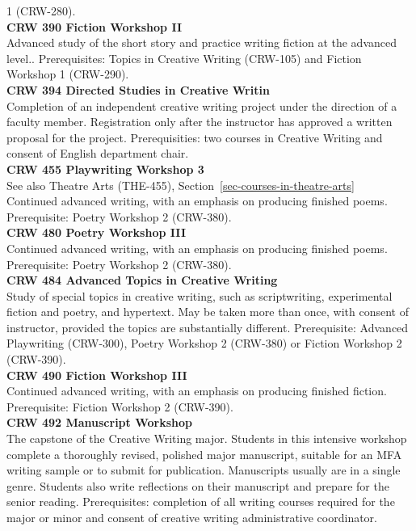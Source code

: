 \documentclass[
  letterpaper,
]{scrbook}
\begin{document}
1 (CRW-280).\\
\textbf{CRW 390 Fiction Workshop II}\\
Advanced study of the short story and practice writing fiction at the
advanced level.. Prerequisites: Topics in Creative Writing (CRW-105) and
Fiction Workshop 1 (CRW-290).\\
\textbf{CRW 394 Directed Studies in Creative Writin}\\
Completion of an independent creative writing project under the
direction of a faculty member. Registration only after the instructor
has approved a written proposal for the project. Prerequisities: two
courses in Creative Writing and consent of English department chair.\\
\textbf{CRW 455 Playwriting Workshop 3}\\
See also Theatre Arts (THE-455),
Section~\ref{sec-courses-in-theatre-arts}\\
Continued advanced writing, with an emphasis on producing finished
poems. Prerequisite: Poetry Workshop 2 (CRW-380).\\
\textbf{CRW 480 Poetry Workshop III}\\
Continued advanced writing, with an emphasis on producing finished
poems. Prerequisite: Poetry Workshop 2 (CRW-380).\\
\textbf{CRW 484 Advanced Topics in Creative Writing}\\
Study of special topics in creative writing, such as scriptwriting,
experimental fiction and poetry, and hypertext. May be taken more than
once, with consent of instructor, provided the topics are substantially
different. Prerequisite: Advanced Playwriting (CRW-300), Poetry Workshop
2 (CRW-380) or Fiction Workshop 2 (CRW-390).\\
\textbf{CRW 490 Fiction Workshop III}\\
Continued advanced writing, with an emphasis on producing finished
fiction. Prerequisite: Fiction Workshop 2 (CRW-390).\\
\textbf{CRW 492 Manuscript Workshop}\\
The capstone of the Creative Writing major. Students in this intensive
workshop complete a thoroughly revised, polished major manuscript,
suitable for an MFA writing sample or to submit for publication.
Manuscripts usually are in a single genre. Students also write
reflections on their manuscript and prepare for the senior reading.
Prerequisites: completion of all writing courses required for the major
or minor and consent of creative writing administrative coordinator.\\
\end{document}
